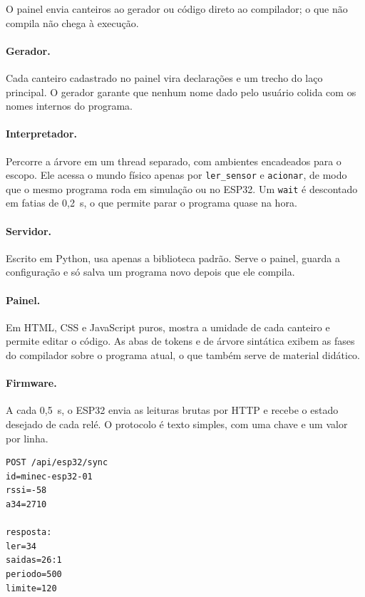 \documentclass[11pt,a4paper]{article}
\newcommand{\cod}[1]{\texttt{#1}}
\begin{document}
O painel envia canteiros ao gerador ou código direto ao compilador; o que não compila não chega à execução.

\paragraph{Gerador.} Cada canteiro cadastrado no painel vira declarações e um trecho do laço principal. O gerador garante que nenhum nome dado pelo usuário colida com os nomes internos do programa.

\paragraph{Interpretador.} Percorre a árvore em um thread separado, com ambientes encadeados para o escopo. Ele acessa o mundo físico apenas por \cod{ler\_sensor} e \cod{acionar}, de modo que o mesmo programa roda em simulação ou no ESP32. Um \cod{wait} é descontado em fatias de 0,2~s, o que permite parar o programa quase na hora.

\paragraph{Servidor.} Escrito em Python, usa apenas a biblioteca padrão. Serve o painel, guarda a configuração e só salva um programa novo depois que ele compila.

\paragraph{Painel.} Em HTML, CSS e JavaScript puros, mostra a umidade de cada canteiro e permite editar o código. As abas de tokens e de árvore sintática exibem as fases do compilador sobre o programa atual, o que também serve de material didático.

\paragraph{Firmware.} A cada 0,5~s, o ESP32 envia as leituras brutas por HTTP e recebe o estado desejado de cada relé. O protocolo é texto simples, com uma chave e um valor por linha.

\begin{lstlisting}[caption={Troca de mensagens entre o ESP32 e o servidor.},label={lst:protocolo}]
POST /api/esp32/sync
id=minec-esp32-01
rssi=-58
a34=2710

resposta:
ler=34
saidas=26:1
periodo=500
limite=120
\end{lstlisting}
\end{document}
